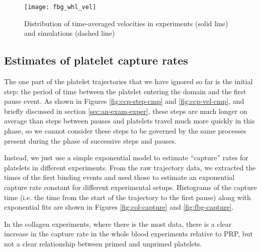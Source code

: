 \begin{figure}
  \centering
  \texttt{[image: fbg\_whl\_vel]}
  \caption{Distribution of time-averaged velocities in experiments
    (solid line) and simulations (dashed line)}
  \label{fig:fbg-whl-vel}
\end{figure}

\subsection{Estimates of platelet capture rates}
\label{sec:estim-plat-capt}

The one part of the platelet trajectories that we have ignored so far
is the initial step: the period of time between the platelet entering
the domain and the first pause event. As shown in Figures
\ref{fig:ccp-step-cmp} and \ref{fig:ccp-vel-cmp}, and briefly
discussed in section \ref{sec:an-exam-exper}, these steps are much
longer on average than steps between pauses and platelets travel much
more quickly in this phase, so we cannot consider these steps to be
governed by the same processes present during the phase of successive
steps and pauses.

Instead, we just use a simple exponential model to estimate
``capture'' rates for platelets in different experiments. From the raw
trajectory data, we extracted the times of the first binding events
and used those to estimate an exponential capture rate constant for
different experimental setups. Histograms of the capture time
(i.e. the time from the start of the trajectory to the first pause)
along with exponential fits are shown in Figures \ref{fig:col-capture}
and \ref{fig:fbg-capture}.

In the collagen experiments, where there is the most data, there is a
clear increase in the capture rate in the whole blood experiments
relative to PRP, but not a clear relationship between primed and
unprimed platelets.

